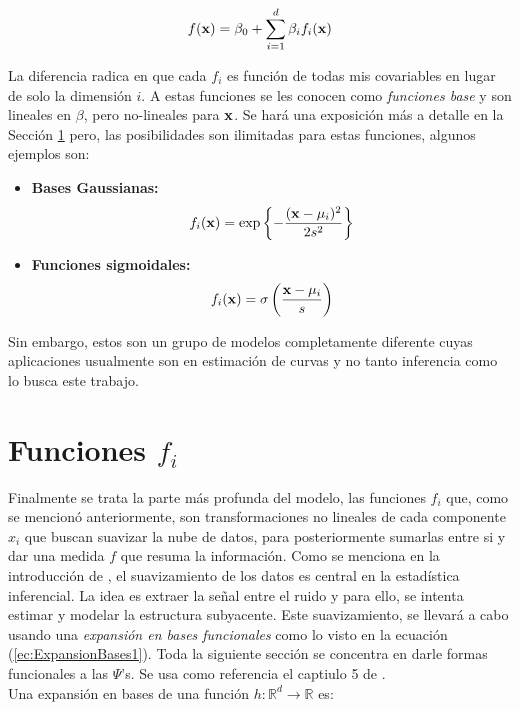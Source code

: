 \documentclass[../Main/Main.tex]{subfiles}
\begin{document}
\begin{align} 
	f(\mathbf{x}) = \beta_0 + \sum_{i = 1}^d\beta_i f_i(\mathbf{x}) \label{ec:ExpansionBases1}
\end{align}

La diferencia radica en que cada $f_i$ es función de todas mis covariables en lugar de solo la dimensión $i$. A estas funciones se les conocen como \textit{funciones base} y son lineales en $\beta$, pero no-lineales para $\mathbf{x}$. Se hará una exposición más a detalle en la Sección \ref{sec:fi} pero, las posibilidades son ilimitadas para estas funciones, algunos ejemplos son:

\begin{itemize}
	\item \textbf{Bases Gaussianas:}
	 $$f_i(\mathbf{x}) = 
	 \exp\left\{-\dfrac{(\mathbf{x} - \mu_i)^2}{2s^2}\right\}$$
	\item \textbf{Funciones sigmoidales:} 
	$$f_i(\mathbf{x}) = 
	\sigma\left( \dfrac{\mathbf{x} - \mu_i}{s} \right)$$
\end{itemize}

Sin embargo, estos son un grupo de modelos completamente diferente cuyas aplicaciones usualmente son en estimación de curvas y no tanto inferencia como lo busca este trabajo.

\section{Funciones $f_i$} \label{sec:fi}

Finalmente se trata la parte más profunda del modelo, las funciones $f_i$  que, como se mencionó anteriormente, son transformaciones no lineales de cada componente $x_i$ que buscan suavizar la nube de datos, para posteriormente sumarlas entre si y dar una medida $f$ que resuma la información. Como se menciona en la introducción de \autocite{hardle2004semiparametric}, el suavizamiento de los datos es central en la estadística inferencial. La idea es extraer la señal entre el ruido y para ello, se intenta estimar y modelar la estructura subyacente. Este suavizamiento, se llevará a cabo usando una \textit{expansión en bases funcionales} como lo visto en la ecuación (\ref{ec:ExpansionBases1}). Toda la siguiente sección se concentra en darle formas funcionales a las $\Psi$'s. Se usa como   referencia el captiulo 5 de \autocite{hastie2008elements}. \\

Una expansión en bases de una función $h:\mathbb{R}^d\rightarrow\mathbb{R}$ es:
\end{document}
